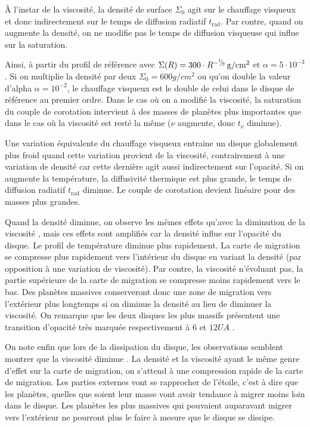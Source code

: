 À l'instar de la viscosité, la densité de surface $\Sigma_0$ agit sur le chauffage visqueux et donc indirectement sur le temps de diffusion radiatif $t_\text{rad}$. Par contre, quand on augmente la densité, on ne modifie pas le temps de diffusion visqueuse qui influe sur la saturation. 

Ainsi, à partir du profil de référence avec $\Sigma(R) = 300 \cdot
R^{-{{}^{1\!\!}/ _{\!2}}}\mathrm{\thinspace g/cm^2}$ et $\alpha=5\cdot 10^{-3}$. Si on multiplie la densité par deux $\Sigma_0=600\unit{g/cm^2}$ ou qu'on double la valeur d'alpha $\alpha=10^{-2}$, le chauffage visqueux est le double de celui dans le disque de référence au premier ordre. Dans le cas où on a modifié la viscosité, la saturation du couple de corotation intervient à des masses de planètes plus importantes que dans le cas où la viscosité est resté la même ($\nu$ augmente, donc $t_\nu$ diminue).  

Une variation équivalente du chauffage visqueux entraine un disque globalement plus froid quand cette variation provient de la viscosité, contrairement à une variation de densité car cette dernière agit aussi indirectement sur l'opacité. 
Si on augmente la température, la diffusivité thermique est plus grande, le temps de diffusion radiatif $t_\text{rad}$ diminue. Le couple de corotation devient linéaire pour des masses plus grandes. 

Quand la densité diminue, on observe les mêmes effets qu'avec la diminution de la viscosité , mais ces effets sont amplifiés car la densité influe sur l'opacité du disque. Le profil de température diminue plus rapidement. La carte de migration se compresse plus rapidement vers l'intérieur du disque en variant la densité (par opposition à une variation de viscosité). Par contre, la viscosité n'évoluant pas, la partie supérieure de la carte de migration se compresse moins rapidement vers le bas. Des planètes massives conserveront donc une zone de migration vers l'extérieur plus longtemps si on diminue la densité au lieu de diminuer la viscosité. On remarque que les deux disques les plus massifs présentent une transition d'opacité très marquée respectivement à $6$  et $12\unit{UA}$ . 

\bigskip

On note enfin que lors de la dissipation du disque, les observations semblent montrer que la viscosité diminue \citep[fig. 16]{guilloteau2011dual}. La densité et la viscosité ayant le même genre d'effet sur la carte de migration, on s'attend à une compression rapide de la carte de migration. Les parties externes vont se rapprocher de l'étoile, c'est à dire que les planètes, quelles que soient leur masse vont avoir tendance à migrer moins loin dans le disque. Les planètes les plus massives qui pouvaient auparavant migrer vers l'extérieur ne pourront plus le faire à mesure que le disque se dissipe. 


